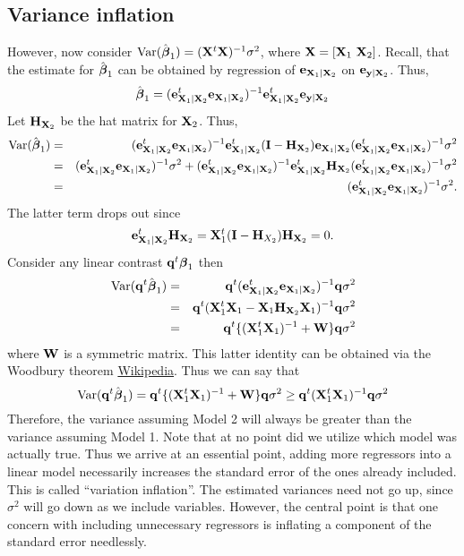 \subsection{Variance inflation}
However, now consider $\mbox{Var}(\hat {\boldsymbol{\beta}}_1) = (\mathbf{X}^t \mathbf{X})^{-1} \sigma^2$, where
$\mathbf{X} = [\mathbf{X}_1 ~ \mathbf{X}_2]$. Recall, that the estimate for $\hat {\boldsymbol{\beta}}_1$ can be
obtained by regression of $\mathbf{e}_{\mathbf{X}_1 | \mathbf{X}_{2}}$ on $\mathbf{e}_{\mathbf{y} | \mathbf{X}_{2}}$. Thus,
$$
\hat {\boldsymbol{\beta}}_1
= (\mathbf{e}_{\mathbf{X}_1 | \mathbf{X}_2}^t \mathbf{e}_{\mathbf{X}_1 | \mathbf{X}_2})^{-1} \mathbf{e}_{\mathbf{X}_1 | \mathbf{X}_2}^t \mathbf{e}_{\mathbf{y} | \mathbf{X}_2}
$$
Let $\mathbf{H}_{\mathbf{X}_2}$ be the hat matrix for $\mathbf{X}_2$. Thus,
\begin{eqnarray*}
\mbox{Var}(\hat {\boldsymbol{\beta}}_1) & = &
(\mathbf{e}_{\mathbf{X}_1 | \mathbf{X}_2}^t \mathbf{e}_{\mathbf{X}_1 | \mathbf{X}_2})^{-1} \mathbf{e}_{\mathbf{X}_1 | \mathbf{X}_2}^t (\mathbf{I} - \mathbf{H}_{\mathbf{X}_2}) \mathbf{e}_{\mathbf{X}_1 | \mathbf{X}_2} (\mathbf{e}_{\mathbf{X}_1 | \mathbf{X}_2}^t \mathbf{e}_{\mathbf{X}_1 | \mathbf{X}_2})^{-1} \sigma^2 \\
& = & (\mathbf{e}_{\mathbf{X}_1 | \mathbf{X}_2}^t \mathbf{e}_{\mathbf{X}_1 | \mathbf{X}_2})^{-1} \sigma^2 + 
(\mathbf{e}_{\mathbf{X}_1 | \mathbf{X}_2}^t \mathbf{e}_{\mathbf{X}_1 | \mathbf{X}_2})^{-1} \mathbf{e}_{\mathbf{X}_1 | \mathbf{X}_2}^t \mathbf{H}_{\mathbf{X}_2} (\mathbf{e}_{\mathbf{X}_1 | \mathbf{X}_2}^t \mathbf{e}_{\mathbf{X}_1 | \mathbf{X}_2})^{-1} \sigma^2 \\
& =  &  (\mathbf{e}_{\mathbf{X}_1 | \mathbf{X}_2}^t \mathbf{e}_{\mathbf{X}_1 | \mathbf{X}_2})^{-1} \sigma^2.
\end{eqnarray*}
The latter term drops out since 
$$
\mathbf{e}_{\mathbf{X}_1 | \mathbf{X}_2}^t \mathbf{H}_{\mathbf{X}_2} = \mathbf{X}_1^t (\mathbf{I} - \mathbf{H}_{X_2}) \mathbf{H}_{\mathbf{X}_2} = 0.
$$
Consider any linear contrast $\mathbf{q}^t \boldsymbol{\beta}_1$ then
\begin{eqnarray*}
\mbox{Var}(\mathbf{q}^t \hat {\boldsymbol{\beta}}_1)& = &\mathbf{q}^t (\mathbf{e}_{\mathbf{X}_1 | \mathbf{X}_2}^t \mathbf{e}_{\mathbf{X}_1 | \mathbf{X}_2})^{-1} \mathbf{q} \sigma^2 \\
& = & \mathbf{q}^t  (\mathbf{X}_1^t\mathbf{X}_1 - \mathbf{X}_1 \mathbf{H}_{\mathbf{X}_2} \mathbf{X}_1)^{-1} \mathbf{q} \sigma^2 \\
& = &\mathbf{q}^t \{(\mathbf{X}_1^t\mathbf{X}_1)^{-1} + \mathbf{W}\}\mathbf{q} \sigma^2
\end{eqnarray*}
where $\mathbf{W}$ is a symmetric matrix. This latter identity can be obtained via the Woodbury theorem
\href{https://en.wikipedia.org/wiki/Woodbury_matrix_identity}{Wikipedia}.
Thus we can say that
$$
\mbox{Var}(\mathbf{q}^t \hat {\boldsymbol{\beta}}_1) = \mathbf{q}^t \{(\mathbf{X}_1^t\mathbf{X}_1)^{-1} + \mathbf{W}\}\mathbf{q} \sigma^2 
\geq \mathbf{q}^t(\mathbf{X}_1^t\mathbf{X}_1)^{-1} \mathbf{q} \sigma^2
$$
Therefore, the variance assuming Model 2 will always be greater than the variance assuming Model 1.
Note that at no point did we utilize which model was actually true. Thus we arrive at an
essential point, adding more regressors into a linear model necessarily increases the
standard error of the ones already included. This is called ``variation inflation''. The
estimated variances need not go up, since $\sigma^2$ will go down as we include variables. 
However, the central point is that one concern with including unnecessary regressors
is inflating a component of the standard error needlessly. 

